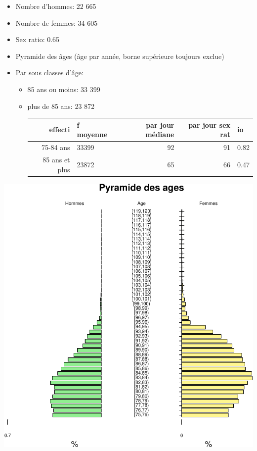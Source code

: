 \documentclass[]{article}
\begin{document}
\begin{itemize}
\itemsep1pt\parskip0pt
\item
  Nombre d'hommes: 22 665
\item
  Nombre de femmes: 34 605
\item
  Sex ratio: 0.65
\item
  Pyramide des âges (âge par année, borne supérieure toujours exclue)
\item
  Par sous classes d'âge:

  \begin{itemize}
  \item
    85 ans ou moins: 33 399
  \item
    plus de 85 ans: 23 872

    \begin{longtable}[c]{@{}rlrrl@{}}
    \toprule
    effecti & f moyenne & par jour médiane & par jour sex rat &
    io\tabularnewline
    \midrule
    \endhead
    75-84 ans & 33399 & 92 & 91 & 0.82\tabularnewline
    85 ans et plus & 23872 & 65 & 66 & 0.47\tabularnewline
    \bottomrule
    \end{longtable}
  \end{itemize}
\end{itemize}

\includegraphics{rapport2014_V4_files/figure-latex/sous_classe_age-1.pdf}
\end{document}
